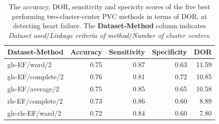 \begin{table}[htb]
    \centering
    \begin{tabular}{lrrrr}
        \toprule
        Dataset-Method    &  Accuracy &  Sensitivity &  Specificity &   DOR \\
        \midrule
        gls-EF/ward/2     &      0.75 &         0.87 &         0.63 & 11.59 \\
        gls-EF/complete/2 &      0.76 &         0.81 &         0.72 & 10.85 \\
        gls-EF/average/2  &      0.75 &         0.85 &         0.65 & 10.58 \\
        rls-EF/complete/2 &      0.73 &         0.86 &         0.60 &  8.89 \\
        gls-rls-EF/ward/2 &      0.72 &         0.84 &         0.60 &  7.80 \\
        \bottomrule
    \end{tabular}
    \caption{The accuracy, DOR, sensitivity and specicity scores of the five best performing two-cluster-center PVC methods in terms of DOR, at detecting heart failure.
             The \textbf{Dataset-Method} column indicates \textit{Dataset used}$/$\textit{Linkage criteria of method}$/$\textit{Number of cluster centers}.}
    \label{tab:pvc_hf_dor_sens_spec_dist}
\end{table}

